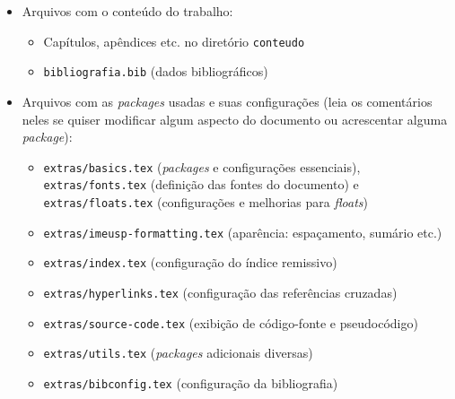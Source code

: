 \begin{itemize}
  \item Arquivos com o conteúdo do trabalho:
  \begin{itemize}
    \item Capítulos, apêndices etc. no diretório \texttt{conteudo}
    \item \texttt{bibliografia.bib} (dados bibliográficos)
  \end{itemize}

  \item Arquivos com as \textit{packages} usadas e suas configurações (leia
        os comentários neles se quiser modificar algum aspecto do
        documento ou acrescentar alguma \textit{package}):
  \begin{itemize}
    \item \texttt{extras/basics.tex} (\textit{packages} e configurações essenciais),
          \texttt{extras/fonts.tex} (definição das fontes do documento) e
          \texttt{extras/floats.tex} (configurações e melhorias para \textit{floats})
    \item \texttt{extras/imeusp-formatting.tex} (aparência: espaçamento, sumário etc.)
    \item \texttt{extras/index.tex} (configuração do índice remissivo)
    \item \texttt{extras/hyperlinks.tex} (configuração das referências cruzadas)
    \item \texttt{extras/source-code.tex} (exibição de código-fonte e pseudocódigo)
    \item \texttt{extras/utils.tex} (\textit{packages} adicionais diversas)
    \item \texttt{extras/bibconfig.tex} (configuração da bibliografia)
  \end{itemize}


\end{itemize}
